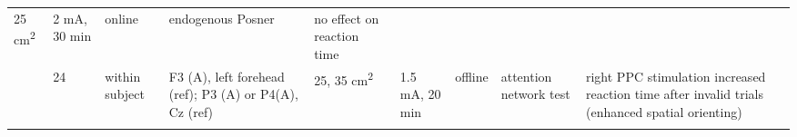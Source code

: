 \documentclass[11pt,english,]{memoir}
\begin{document}
\begin{longtable}[]{@{}lllllllll@{}}
\begin{minipage}[t]{0.03\columnwidth}
25
cm\textsuperscript{2}\strut
\end{minipage} & \begin{minipage}[t]{0.05\columnwidth}\raggedright
2 mA, 30
min\strut
\end{minipage} & \begin{minipage}[t]{0.05\columnwidth}\raggedright
online\strut
\end{minipage} & \begin{minipage}[t]{0.11\columnwidth}\raggedright
endogenous Posner\strut
\end{minipage} & \begin{minipage}[t]{0.24\columnwidth}\raggedright
no effect on reaction time\strut
\end{minipage}\tabularnewline
\begin{minipage}[t]{0.12\columnwidth}\raggedright
\textcite{Roy2015}\strut
\end{minipage} & \begin{minipage}[t]{0.02\columnwidth}\raggedright
24\strut
\end{minipage} & \begin{minipage}[t]{0.04\columnwidth}\raggedright
within
subject\strut
\end{minipage} & \begin{minipage}[t]{0.11\columnwidth}\raggedright
F3 (A), left forehead
(ref); P3 (A) or P4(A),
Cz (ref)\strut
\end{minipage} & \begin{minipage}[t]{0.03\columnwidth}\raggedright
25,
35
cm\textsuperscript{2}\strut
\end{minipage} & \begin{minipage}[t]{0.05\columnwidth}\raggedright
1.5 mA, 20
min\strut
\end{minipage} & \begin{minipage}[t]{0.05\columnwidth}\raggedright
offline\strut
\end{minipage} & \begin{minipage}[t]{0.11\columnwidth}\raggedright
attention network test\strut
\end{minipage} & \begin{minipage}[t]{0.24\columnwidth}\raggedright
right PPC stimulation increased reaction time after invalid
trials (enhanced spatial orienting)\strut
\end{minipage}\tabularnewline
\begin{minipage}[t]{0.12\columnwidth}\raggedright
\textcite{Coffman2012}\strut
\end{minipage} & \begin{minipage}[t]{0.02\columnwidth}\raggedright

\end{minipage}
\end{longtable}
\end{document}
